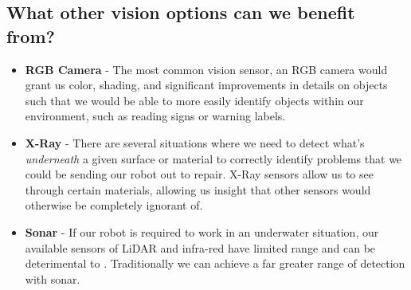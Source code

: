 \documentclass{article}
\begin{document}
\subsection*{What other vision options can we benefit from?}

\begin{itemize}
    \item \textbf{RGB Camera} - The most common vision sensor, an RGB camera would grant us color, shading, and significant improvements in details on objects such that we would be able to more easily identify objects within our environment, such as reading signs or warning labels.
    \item \textbf{X-Ray} - There are several situations where we need to detect what's \textit{underneath} a given surface or material to correctly identify problems that we could be sending our robot out to repair. X-Ray sensors allow us to see through certain materials, allowing us insight that other sensors would otherwise be completely ignorant of.
    \item \textbf{Sonar} - If our robot is required to work in an underwater situation, our available sensors of LiDAR and infra-red have limited range and can be deterimental to . Traditionally we can achieve a far greater range of detection with sonar.
\end{itemize}
\end{document}
